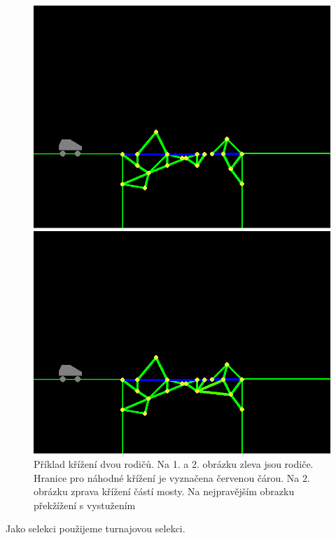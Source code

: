 \begin{figure}[ht]
\begin{minipage}{0.24\textwidth}
        \includegraphics[width=\linewidth]{img/bridge_crossed.png}
    \end{minipage}
    \begin{minipage}{0.24\textwidth}
        \centering
        \includegraphics[width=\linewidth]{img/bridge_sups.png}
    \end{minipage}
    \caption{Příklad křížení dvou rodičů. Na 1. a 2. obrázku zleva jsou rodiče. Hranice pro náhodné křížení je vyznačena červenou čárou. Na 2. obrázku zprava křížení částí mosty. Na nejpravějším obrazku překžížení s vystužením}
    \label{impl-fig:8}
\end{figure}

Jako selekci použijeme turnajovou selekci.

